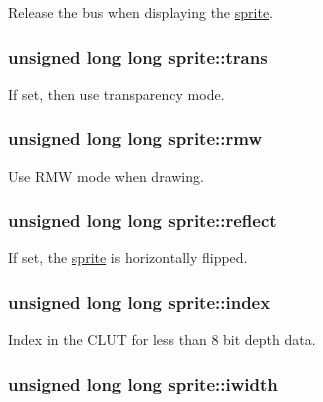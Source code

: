 Release the bus when displaying the \hyperlink{structsprite}{sprite}. \hypertarget{structsprite_5f50a077f6202430f741e41254a3c55d}{
\subsubsection{\setlength{\rightskip}{0pt plus 5cm}unsigned long long {\bf sprite::trans}}}
\label{structsprite_5f50a077f6202430f741e41254a3c55d}


If set, then use transparency mode. \hypertarget{structsprite_b0fd324a0b22a49f4d7bf9443285542c}{
\subsubsection{\setlength{\rightskip}{0pt plus 5cm}unsigned long long {\bf sprite::rmw}}}
\label{structsprite_b0fd324a0b22a49f4d7bf9443285542c}


Use RMW mode when drawing. \hypertarget{structsprite_baf8f4f465918546d5ae6603b978f39f}{
\subsubsection{\setlength{\rightskip}{0pt plus 5cm}unsigned long long {\bf sprite::reflect}}}
\label{structsprite_baf8f4f465918546d5ae6603b978f39f}


If set, the \hyperlink{structsprite}{sprite} is horizontally flipped. \hypertarget{structsprite_fdbad9f27ebbe556fbe1b074a7ff4415}{
\subsubsection{\setlength{\rightskip}{0pt plus 5cm}unsigned long long {\bf sprite::index}}}
\label{structsprite_fdbad9f27ebbe556fbe1b074a7ff4415}


Index in the CLUT for less than 8 bit depth data. \hypertarget{structsprite_9760cacbb8af137eebd03411527cfc98}{
\subsubsection{\setlength{\rightskip}{0pt plus 5cm}unsigned long long {\bf sprite::iwidth}}}
\label{structsprite_9760cacbb8af137eebd03411527cfc98}


